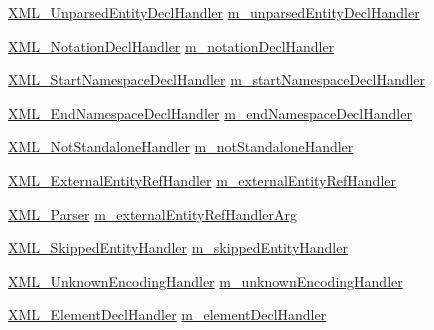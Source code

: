 \begin{DoxyCompactItemize}
\item 
\hyperlink{amiga_2include_2libraries_2expat_8h_ac9efd6bd68d4a7fe131a5b7c3aea3ecb}{X\+M\+L\+\_\+\+Unparsed\+Entity\+Decl\+Handler} \hyperlink{struct_x_m_l___parser_struct_a9f4c8200eb8dda402236d261adf32b52}{m\+\_\+unparsed\+Entity\+Decl\+Handler}
\item 
\hyperlink{amiga_2include_2libraries_2expat_8h_aef0016a1ec3be3897018f6a9650bbb4c}{X\+M\+L\+\_\+\+Notation\+Decl\+Handler} \hyperlink{struct_x_m_l___parser_struct_a84717e5fb8026b218d03d73ed0f0299e}{m\+\_\+notation\+Decl\+Handler}
\item 
\hyperlink{amiga_2include_2libraries_2expat_8h_ac7cab9ef88e3ff98ce6e7ff84a8581e5}{X\+M\+L\+\_\+\+Start\+Namespace\+Decl\+Handler} \hyperlink{struct_x_m_l___parser_struct_adfbf782b508a7da21bab64c061c8e61d}{m\+\_\+start\+Namespace\+Decl\+Handler}
\item 
\hyperlink{amiga_2include_2libraries_2expat_8h_a4441a99b0c8de22aed4ced86b425c5e7}{X\+M\+L\+\_\+\+End\+Namespace\+Decl\+Handler} \hyperlink{struct_x_m_l___parser_struct_a25ab97f84dd6cec6970623862c07bb86}{m\+\_\+end\+Namespace\+Decl\+Handler}
\item 
\hyperlink{amiga_2include_2libraries_2expat_8h_a1cadb615cc7347bd076a4eafcaf687fa}{X\+M\+L\+\_\+\+Not\+Standalone\+Handler} \hyperlink{struct_x_m_l___parser_struct_add1d9b1928a930eb22f27b0200b2bbd6}{m\+\_\+not\+Standalone\+Handler}
\item 
\hyperlink{amiga_2include_2libraries_2expat_8h_ac8ff16e5cabd8d1c5543bc091ded0498}{X\+M\+L\+\_\+\+External\+Entity\+Ref\+Handler} \hyperlink{struct_x_m_l___parser_struct_a15b31b68130723af3222a3f537f734c5}{m\+\_\+external\+Entity\+Ref\+Handler}
\item 
\hyperlink{amiga_2include_2libraries_2expat_8h_a9dc0003156857c67b3a60b3993846013}{X\+M\+L\+\_\+\+Parser} \hyperlink{struct_x_m_l___parser_struct_a3cac7d85828459eb9154eaff06125762}{m\+\_\+external\+Entity\+Ref\+Handler\+Arg}
\item 
\hyperlink{amiga_2include_2libraries_2expat_8h_ab88af945eaab479fcd1af46a350fdaea}{X\+M\+L\+\_\+\+Skipped\+Entity\+Handler} \hyperlink{struct_x_m_l___parser_struct_a33d3d321ce9b22aef858d7e9861ff769}{m\+\_\+skipped\+Entity\+Handler}
\item 
\hyperlink{amiga_2include_2libraries_2expat_8h_ab691c80c3d3d8d26ecf07c81c1bcf28b}{X\+M\+L\+\_\+\+Unknown\+Encoding\+Handler} \hyperlink{struct_x_m_l___parser_struct_a1937b4391b3f10406fe06c11f2b449a7}{m\+\_\+unknown\+Encoding\+Handler}
\item 
\hyperlink{amiga_2include_2libraries_2expat_8h_ae7ba85fbf531f8be7646b1a7d8c2200b}{X\+M\+L\+\_\+\+Element\+Decl\+Handler} \hyperlink{struct_x_m_l___parser_struct_aaff32680453d43b238fe668620f2ca41}{m\+\_\+element\+Decl\+Handler}

\end{DoxyCompactItemize}
